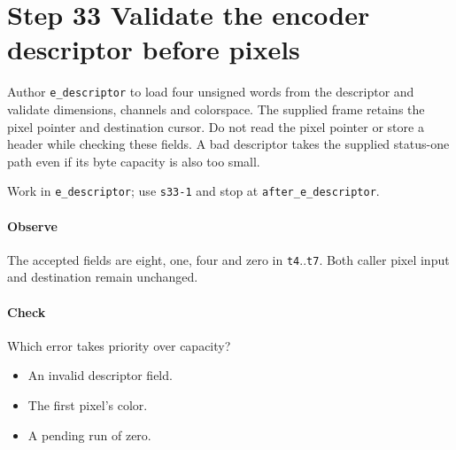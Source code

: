 \section{Step 33 Validate the encoder descriptor before pixels}\label{qoi-s33}
Author \texttt{e\_descriptor} to load four unsigned words from the descriptor and validate dimensions, channels and colorspace. The supplied frame retains the pixel pointer and destination cursor. Do not read the pixel pointer or store a header while checking these fields. A bad descriptor takes the supplied status-one path even if its byte capacity is also too small.

Work in \texttt{e\_descriptor}; use \texttt{s33-1} and stop at \texttt{after\_e\_descriptor}.

\paragraph{Observe} The accepted fields are eight, one, four and zero in \texttt{t4}..\texttt{t7}. Both caller pixel input and destination remain unchanged.

\paragraph{Check} Which error takes priority over capacity?
\begin{itemize}
  \item[A.] An invalid descriptor field.
  \item[B.] The first pixel’s color.
  \item[C.] A pending run of zero.
\end{itemize}
